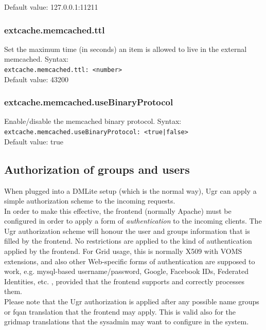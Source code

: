 \documentclass[12pt]{article} %
\begin{document}
Default value: 127.0.0.1:11211

\subsubsection{extcache.memcached.ttl}
Set the maximum time (in seconds) an item is allowed to live in the external memcached.
Syntax:\\
\lstinline"extcache.memcached.ttl: <number>"\\
Default value: 43200\\

\subsubsection{extcache.memcached.useBinaryProtocol}
Enable/disable the memcached binary protocol.
Syntax:\\
\lstinline"extcache.memcached.useBinaryProtocol: <true|false>"\\
Default value: true\\






\subsection{Authorization of groups and users}

When plugged into a DMLite setup (which is the normal way), Ugr can apply a simple authorization scheme to the incoming requests.\\
In order to make this effective, the frontend (normally Apache) must be configured in order to apply a form of \textit{authentication} to the incoming clients. The Ugr authorization scheme will
honour the user and groups information that is filled by the frontend. No restrictions are applied to the kind of authentication applied by the frontend. For Grid usage, this is normally X509 with
VOMS extensions, and also other Web-specific forms of authentication are supposed to work, e.g. mysql-based username/password, Google, Facebook IDs, Federated Identities, etc. , provided that the frontend supports and correctly processes them.\\
Please note that the Ugr authorization is applied after any possible name groups or fqan translation that the frontend may apply. This is valid also for the gridmap translations that the sysadmin may want to configure in the system.\\
\end{document}
